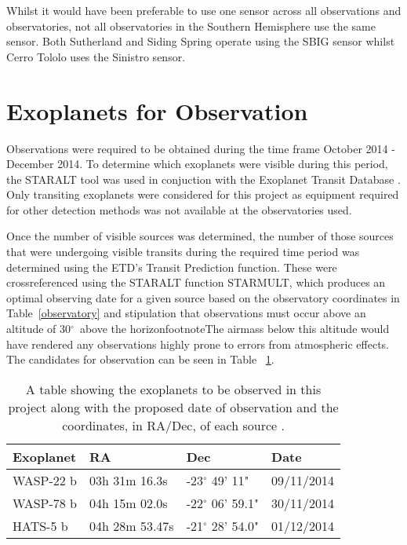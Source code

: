 \documentclass{report}
\begin{document}
Whilst it would have been preferable to use one sensor across all observations and observatories, not all observatories in the Southern Hemisphere use the same sensor. Both Sutherland and Siding Spring operate using the SBIG sensor whilst Cerro Tololo uses the Sinistro sensor.   


\section{Exoplanets for Observation}
Observations were required to be obtained during the time frame October 2014 - December 2014. To determine which exoplanets were visible during this period, the STARALT tool \parencite{staralt} was used in conjuction with the Exoplanet Transit Database \parencite{etd}. Only transiting exoplanets were considered for this project as equipment required for other detection methods was not available at the observatories used. 

Once the number of visible sources was determined, the number of those sources that were undergoing visible transits during the required time period was determined using the ETD's Transit Prediction function. These were crossreferenced using the STARALT function STARMULT, which produces an optimal observing date for a given source based on the observatory coordinates in Table~\ref{observatory} and stipulation that observations must occur above an altitude of 30$^\circ$\ above the horizonfootnote{The airmass below this altitude would have rendered any observations highly prone to errors from atmospheric effects}. The candidates for observation can be seen in Table ~\ref{planets}.

\begin{table}[H]
    \centering
    \begin{tabular}{ | l | l | l | l | }
    \hline \hline
    Exoplanet & RA & Dec & Date       \\ \hline \hline
    WASP-22 b    & 03h 31m 16.3s & -23$^\circ$ 49' 11" & 09/11/2014 \\
    WASP-78 b   & 04h 15m 02.0s & -22$^\circ$ 06' 59.1" & 30/11/2014 \\
    HATS-5 b  & 04h 28m 53.47s & -21$^\circ$ 28' 54.0" & 01/12/2014 \\
    \hline
    \end{tabular}
    \caption{A table showing the exoplanets to be observed in this project along with the proposed date of observation and the coordinates, in RA/Dec, of each source \parencite{etd}.}
    \label{planets}
\end{table}
\end{document}
